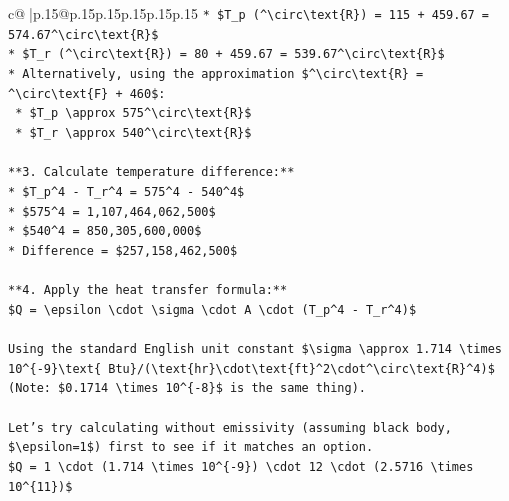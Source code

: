 \documentclass{article}
\begin{document}
{\begin{supertabular}{c@{$\;$}|p{.15\linewidth}@{}p{.15\linewidth}p{.15\linewidth}p{.15\linewidth}p{.15\linewidth}p{.15\linewidth}}
{{{\texttt{*   \$T\_p (\^{}\textbackslash{}circ\textbackslash{}text\{R\}) = 115 + 459.67 = 574.67\^{}\textbackslash{}circ\textbackslash{}text\{R\}\$} \\
\texttt{*   \$T\_r (\^{}\textbackslash{}circ\textbackslash{}text\{R\}) = 80 + 459.67 = 539.67\^{}\textbackslash{}circ\textbackslash{}text\{R\}\$} \\
\texttt{*   Alternatively, using the approximation \$\^{}\textbackslash{}circ\textbackslash{}text\{R\} = \^{}\textbackslash{}circ\textbackslash{}text\{F\} + 460\$:} \\
\texttt{    *   \$T\_p \textbackslash{}approx 575\^{}\textbackslash{}circ\textbackslash{}text\{R\}\$} \\
\texttt{    *   \$T\_r \textbackslash{}approx 540\^{}\textbackslash{}circ\textbackslash{}text\{R\}\$} \\
\\ 
\texttt{**3. Calculate temperature difference:**} \\
\texttt{*   \$T\_p\^{}4 {-} T\_r\^{}4 = 575\^{}4 {-} 540\^{}4\$} \\
\texttt{*   \$575\^{}4 = 1,107,464,062,500\$} \\
\texttt{*   \$540\^{}4 = 850,305,600,000\$} \\
\texttt{*   Difference = \$257,158,462,500\$} \\
\\ 
\texttt{**4. Apply the heat transfer formula:**} \\
\texttt{\$Q = \textbackslash{}epsilon \textbackslash{}cdot \textbackslash{}sigma \textbackslash{}cdot A \textbackslash{}cdot (T\_p\^{}4 {-} T\_r\^{}4)\$} \\
\\ 
\texttt{Using the standard English unit constant \$\textbackslash{}sigma \textbackslash{}approx 1.714 \textbackslash{}times 10\^{}\{{-}9\}\textbackslash{}text\{ Btu\}/(\textbackslash{}text\{hr\}\textbackslash{}cdot\textbackslash{}text\{ft\}\^{}2\textbackslash{}cdot\^{}\textbackslash{}circ\textbackslash{}text\{R\}\^{}4)\$ (Note: \$0.1714 \textbackslash{}times 10\^{}\{{-}8\}\$ is the same thing).} \\
\\ 
\texttt{Let's try calculating without emissivity (assuming black body, \$\textbackslash{}epsilon=1\$) first to see if it matches an option.} \\
\texttt{\$Q = 1 \textbackslash{}cdot (1.714 \textbackslash{}times 10\^{}\{{-}9\}) \textbackslash{}cdot 12 \textbackslash{}cdot (2.5716 \textbackslash{}times 10\^{}\{11\})\$} \\
}}}
\end{supertabular}}
\end{document}
